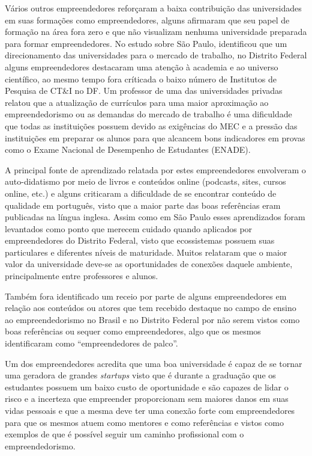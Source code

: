 Vários outros empreendedores reforçaram a baixa contribuição das universidades em suas formações como empreendedores, alguns afirmaram que seu papel de formação na área fora zero e que não visualizam nenhuma universidade preparada para formar empreendedores. No estudo sobre São Paulo,  identificou que um direcionamento das universidades para o mercado de trabalho, no Distrito Federal alguns empreendedores destacaram uma atenção à academia e ao universo científico, ao mesmo tempo fora críticada o baixo número de Institutos de Pesquisa de CT\&I no DF. Um professor de uma das universidades privadas relatou que a atualização de currículos para uma maior aproximação ao empreendedorismo ou as demandas do mercado de trabalho é uma dificuldade que todas as instituições possuem devido as exigências do MEC e a pressão das instituições em preparar os alunos para que alcancem bons indicadores em provas como o Exame Nacional de Desempenho de Estudantes (ENADE). 

A principal fonte de aprendizado relatada por estes empreendedores envolveram o auto-didatismo por meio de livros e conteúdos online (podcasts, sites, cursos online, etc.) e alguns criticaram a dificuldade de se encontrar conteúdo de qualidade em português, visto que a maior parte das boas referências eram publicadas na língua inglesa. Assim como em São Paulo esses aprendizados foram levantados como ponto que merecem cuidado quando aplicados por empreendedores do Distrito Federal, visto que ecossistemas possuem suas particulares e diferentes níveis de maturidade. Muitos relataram que o maior valor da universidade deve-se as oportunidades de conexões daquele ambiente, principalmente entre professores e alunos.

Também fora identificado um receio por parte de alguns empreendedores em relação aos conteúdos ou atores que tem recebido destaque no campo de ensino ao empreendedorismo no Brasil e no Distrito Federal por não serem vistos como boas referências ou sequer como empreendedores, algo que os mesmos identificaram como ``empreendedores de palco''.

Um dos empreendedores acredita que uma boa universidade é capaz de se tornar uma geradora de grandes \textit{startups} visto que é durante a graduação que os estudantes possuem um baixo custo de oportunidade e são capazes de lidar o risco e a incerteza que empreender proporcionam sem maiores danos em suas vidas pessoais e que a mesma deve ter uma conexão forte com empreendedores para que os mesmos atuem como mentores e como referências e vistos como exemplos de que é possível seguir um caminho profissional com o empreendedorismo.

